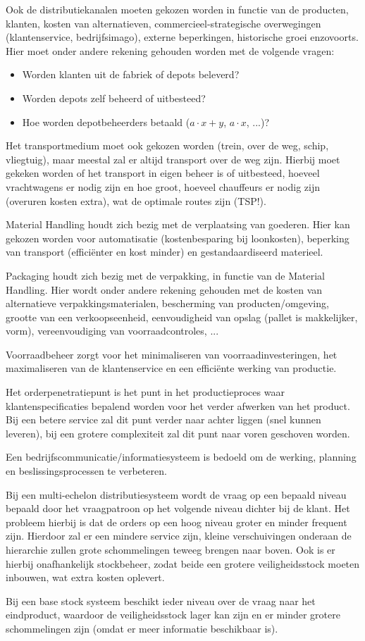 \documentclass[../../samenvatting.tex]{subfiles}
\begin{document}
Ook de distributiekanalen moeten gekozen worden in functie van de producten, klanten, kosten van alternatieven, commercieel-strategische overwegingen (klantenservice, bedrijfsimago), externe beperkingen, historische groei enzovoorts. Hier moet onder andere rekening gehouden worden met de volgende vragen:
\begin{itemize}
    \item Worden klanten uit de fabriek of depots beleverd?
    \item Worden depots zelf beheerd of uitbesteed?
    \item Hoe worden depotbeheerders betaald ($a\cdot x+y$, $a\cdot x$, ...)?
\end{itemize}

Het transportmedium moet ook gekozen worden (trein, over de weg, schip, vliegtuig), maar meestal zal er altijd transport over de weg zijn. Hierbij moet gekeken worden of het transport in eigen beheer is of uitbesteed, hoeveel vrachtwagens er nodig zijn en hoe groot, hoeveel chauffeurs er nodig zijn (overuren kosten extra), wat de optimale routes zijn (TSP!).

Material Handling houdt zich bezig met de verplaatsing van goederen. Hier kan gekozen worden voor automatisatie (kostenbesparing bij loonkosten), beperking van transport (efficiënter en kost minder) en gestandaardiseerd materieel.

Packaging houdt zich bezig met de verpakking, in functie van de Material Handling. Hier wordt onder andere rekening gehouden met de kosten van alternatieve verpakkingsmaterialen, bescherming van producten/omgeving, grootte van een verkoopseenheid, eenvoudigheid van opslag (pallet is makkelijker, vorm), vereenvoudiging van voorraadcontroles, ...

Voorraadbeheer zorgt voor het minimaliseren van voorraadinvesteringen, het maximaliseren van de klantenservice en een efficiënte werking van productie. 

Het orderpenetratiepunt is het punt in het productieproces waar klantenspecificaties bepalend worden voor het verder afwerken van het product. Bij een betere service zal dit punt verder naar achter liggen (snel kunnen leveren), bij een grotere complexiteit zal dit punt naar voren geschoven worden.

Een bedrijfscommunicatie/informatiesysteem is bedoeld om de werking, planning en beslissingsprocessen te verbeteren.

Bij een multi-echelon distributiesysteem wordt de vraag op een bepaald niveau bepaald door het vraagpatroon op het volgende niveau dichter bij de klant. Het probleem hierbij is dat de orders op een hoog niveau groter en minder frequent zijn. Hierdoor zal er een mindere service zijn, kleine verschuivingen onderaan de hierarchie zullen grote schommelingen teweeg brengen naar boven. Ook is er hierbij onafhankelijk stockbeheer, zodat beide een grotere veiligheidsstock moeten inbouwen, wat extra kosten oplevert.

Bij een base stock systeem beschikt ieder niveau over de vraag naar het eindproduct, waardoor de veiligheidsstock lager kan zijn en er minder grotere schommelingen zijn (omdat er meer informatie beschikbaar is).
\end{document}
